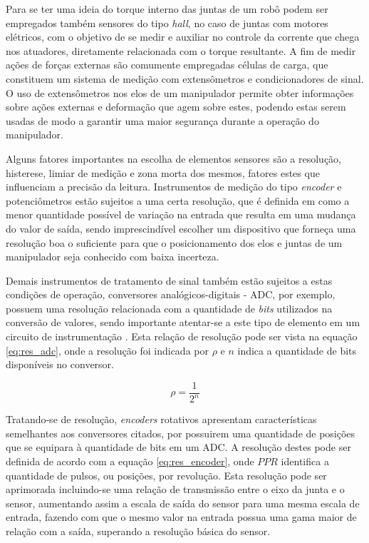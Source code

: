 Para se ter uma ideia do torque interno das juntas de um robô podem ser empregados também sensores do tipo \textit{hall}, no caso de juntas com motores elétricos, 
com o objetivo de se medir e auxiliar no controle da corrente que chega nos atuadores, diretamente relacionada com o torque resultante. A fim de medir ações de forças 
externas são comumente empregadas células de carga, que constituem um sistema de medição com extensômetros e condicionadores de sinal. O uso de extensômetros nos 
elos de um manipulador permite obter informações sobre ações externas e deformação que agem sobre estes, podendo estas serem usadas de modo a garantir uma maior
segurança durante a operação do manipulador.

Alguns fatores importantes na escolha de elementos sensores são a 
resolução, histerese, limiar de medição e zona morta dos mesmos, 
fatores estes que influenciam a precisão da leitura. 
Instrumentos de medição do tipo \textit{encoder} e potenciômetros 
estão sujeitos a uma certa resolução, que é definida em \cite{doebelin2007measurement} 
como a menor quantidade possível de variação na entrada que resulta 
em uma mudança do valor de saída, sendo imprescindível escolher um 
dispositivo que forneça uma resolução boa o suficiente para que o 
posicionamento dos elos e juntas de um manipulador seja conhecido 
com baixa incerteza.

Demais instrumentos de tratamento de sinal também estão sujeitos a estas
condições de operação, conversores analógicos-digitais - ADC, por exemplo, possuem
uma resolução relacionada com a quantidade de \textit{bits} utilizados
na conversão de valores, sendo importante atentar-se a este tipo de 
elemento em um circuito de instrumentação \cite{bentley2005principles}. 
Esta relação de resolução pode ser vista na equação \ref{eq:res_adc}, 
onde a resolução foi indicada
por $\rho$ e $n$ indica a quantidade de bits disponíveis no conversor.

\begin{equation}
    \label{eq:res_adc}
    \rho = \frac{1}{2^n}
\end{equation}

Tratando-se de resolução, \textit{encoders} rotativos apresentam características
semelhantes aos conversores citados, por possuirem uma quantidade de posições  
que se equipara à quantidade de bits em um ADC. 
A resolução destes pode ser definida de acordo com
a equação \ref{eq:res_encoder}, onde $PPR$ identifica a quantidade de 
pulsos, ou posições, por revolução. Esta resolução pode ser aprimorada
incluindo-se uma relação de transmissão entre o eixo da junta e o sensor,
aumentando assim a escala de saída do sensor para uma mesma escala
de entrada, fazendo com que o mesmo valor na entrada possua uma gama maior
de relação com a saída, superando a resolução básica do sensor.

